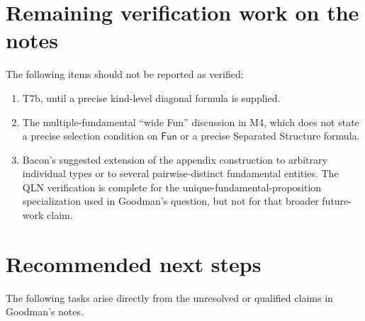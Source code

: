 \documentclass[12pt,leqno]{article}
\theoremstyle{plain}
\theoremstyle{definition}
\newcommand{\Fun}{\ensuremath{\mathsf{Fun}}}
\begin{document}
\section{Remaining verification work on the notes}

The following items should not be reported as verified:

\begin{enumerate}
\item T7b, until a precise kind-level diagonal formula is supplied.
\item The multiple-fundamental ``wide Fun'' discussion in M4, which does not
      state a precise selection condition on \(\Fun\) or a precise Separated
      Structure formula.
\item Bacon's suggested extension of the appendix construction to arbitrary
      individual types or to several pairwise-distinct fundamental entities.
      The QLN verification is complete for the unique-fundamental-proposition
      specialization used in Goodman's question, but not for that broader
      future-work claim.
\end{enumerate}

\section{Recommended next steps}

The following tasks arise directly from the unresolved or qualified claims in
Goodman's notes.
\end{document}
